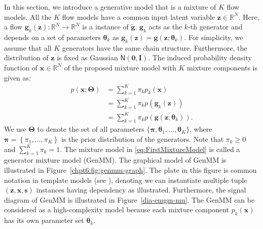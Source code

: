 In this section, we introduce a generative model that is a mixture of $K$ flow models. All the $K$ flow models have a common input latent variable $\bm{z} \in \mathbb{R}^N$. Here, a flow $\bm{g}_k(\bm{z}): \mathbb{R}^N
\rightarrow \mathbb{R}^N$ is a instance of $\tilde{\bm{g}}$. $\bm{g}_k$ acts as the $k$-th generator and depends on a set of parameters $\bm{\theta}_k$ as
$\bm{g}_k(\bm{z})=\bm{g}(\bm{z};\boldsymbol{\theta}_k)$. For
simplicity, we assume that all $K$ generators have the same
chain structure. Furthermore, the distribution of $\bm{z}$ is fixed as Gaussian $\mathsf{N}(\bm{0},\bm{I})$.
The induced probability density function of $\bm{x} \in \mathbb{R}^N$ of the proposed mixture model with $K$ mixture components is given as:
\begin{align}\label{eq:FirstMixtureModel}
  p(\bm{x};\bm{\Theta})  &= \textstyle\sum_{k=1}^K \pi_k  p_k(\bm{x}) \nonumber\\
                         &= \textstyle \sum_{k=1}^K \pi_k  p(\bm{g}_k(\bm{z}))\nonumber\\
                         &= \textstyle \sum_{k=1}^K \pi_k  p(\bm{g}(\bm{z};\boldsymbol{\theta}_k)).
\end{align}
We use $\bm{\Theta}$ to denote the set of all parameters $ \{\bm{\pi},\bm{\theta}_1, \dots, \bm{\theta}_K \}$, where $\bm{\pi} = \left\{ \pi_1, \hdots, \pi_K \right\}$ is the prior distribution of the generators. Note that $\pi_k \geq 0$ and $\sum_{k=1}^K \pi_k =1$. The mixture model
in \eqref{eq:FirstMixtureModel} is called a generator mixture model (GenMM). The graphical model of GenMM is illustrated in Figure~\ref{chpt6:fig:genmm-graph}. The plate in this figure is common notation in template models (see \cite[Section~6]{koller2009pgm}), denoting we can instantiate multiple tuple $(\bm{z}, \bm{x}, \bm{s})$ instances having dependency as illustrated. Furthermore, the
signal diagram of GenMM is illustrated in Figure~\ref{dia-emgm-nm}. The GenMM can be considered as a high-complexity model because each mixture component $p_k(\bm{x})$ has its own parameter set $\bm{\theta}_k$. 

